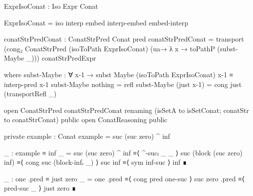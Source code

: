 \begin{code}
ExprIsoConat : Iso Expr Conat
\end{code}
\begin{code}[hide]
ExprIsoConat = iso interp embed interp-embed embed-interp
\end{code}
\begin{code}
conatStrPredConat : ConatStrPred Conat pred
conatStrPredConat =
  transport
    (cong₂ ConatStrPred
      (isoToPath ExprIsoConat)
      (ua→ λ x → toPathP (subst-Maybe _)))
    conatStrPredExpr
\end{code}
\begin{code}[hide]
  where
  subst-Maybe :
    ∀ x-1 → subst Maybe (isoToPath ExprIsoConat) x-1 ≡ interp-pred x-1
  subst-Maybe nothing = refl
  subst-Maybe (just x-1) = cong just (transportRefl _)

open ConatStrPred conatStrPredConat
  renaming (isSetA to isSetConat; conatStr to conatStrConat) public
open ConatReasoning public

private
  example : Conat
  example = suc (suc zero) ^ inf

  _ : example ≡ inf
  _ =
    suc (suc zero) ^ inf       ≡⟨ ^-sucₗ _ _ ⟩
    suc (block (suc zero) inf) ≡⟨ cong suc (block-infᵣ _) ⟩
    suc inf                    ≡⟨ sym inf-suc ⟩
    inf                        ∎

  _ : one .pred ≡ just zero
  _ =
    one .pred      ≡⟨ cong pred one-suc ⟩
    suc zero .pred ≡⟨ pred-suc _ ⟩
    just zero      ∎
\end{code}
